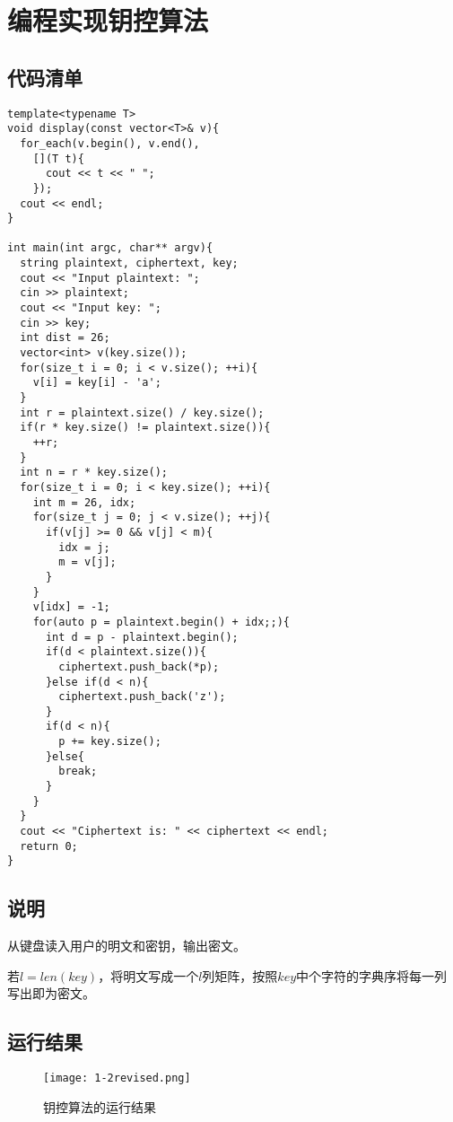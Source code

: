 \documentclass[11pt]{article}
\begin{document}
\section{编程实现钥控算法}
\subsection{代码清单}
\begin{center}
\begin{lstlisting}[caption = {钥控算法的C++实现}, label = {lst: code2}]
template<typename T>
void display(const vector<T>& v){
  for_each(v.begin(), v.end(),
    [](T t){
      cout << t << " ";
    });
  cout << endl;
}

int main(int argc, char** argv){
  string plaintext, ciphertext, key;
  cout << "Input plaintext: ";
  cin >> plaintext;
  cout << "Input key: ";
  cin >> key;
  int dist = 26;
  vector<int> v(key.size());
  for(size_t i = 0; i < v.size(); ++i){
    v[i] = key[i] - 'a';
  }
  int r = plaintext.size() / key.size();
  if(r * key.size() != plaintext.size()){
    ++r;
  }
  int n = r * key.size();
  for(size_t i = 0; i < key.size(); ++i){
    int m = 26, idx;
    for(size_t j = 0; j < v.size(); ++j){
      if(v[j] >= 0 && v[j] < m){
        idx = j;
        m = v[j];
      }
    }
    v[idx] = -1;
    for(auto p = plaintext.begin() + idx;;){
      int d = p - plaintext.begin();
      if(d < plaintext.size()){
        ciphertext.push_back(*p);
      }else if(d < n){
        ciphertext.push_back('z');
      }
      if(d < n){
        p += key.size();
      }else{
        break;
      }
    }
  }
  cout << "Ciphertext is: " << ciphertext << endl;
  return 0;
}
\end{lstlisting}
\end{center}

\subsection{说明}
从键盘读入用户的明文和密钥，输出密文。

若$l = len(key)$，将明文写成一个$l$列矩阵，按照$key$中个字符的字典序将每一列写出即为密文。

\subsection{运行结果}
\begin{center}
\begin{figure}[htbp]
\texttt{[image: 1-2revised.png]}
\caption{钥控算法的运行结果}
\label{fig: rlt2}
\end{figure}
\end{center}
\end{document}
